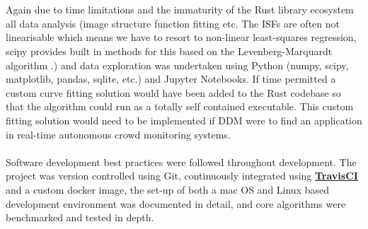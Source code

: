 \documentclass[11pt]{article}
\let\oldhref\href
\renewcommand{\href}[2]{\oldhref{#1}{\bfseries#2}}
\begin{document}
\\\\
Again due to time limitations and the immaturity of the Rust library ecosystem all data analysis (image structure function fitting etc. The ISFs are often not linearisable which means we have to resort to non-linear least-squares regression, scipy provides built in methods for this based on the Levenberg-Marquardt algorithm \cite{scipy_fit}.) and data exploration was undertaken using Python (numpy, scipy, matplotlib, pandas, sqlite, etc.) and Jupyter Notebooks. If time permitted a custom curve fitting solution would have been added to the Rust codebase so that the algorithm could run as a totally self contained executable. This custom fitting solution would need to be implemented if DDM were to find an application in real-time autonomous crowd monitoring systems.
\\\\
Software development best practices were followed throughout development. The project was version controlled using Git, continuously integrated using \href{https://travis-ci.com}{TravisCI} and a custom docker image, the set-up of both a mac OS and Linux based development environment was documented in detail, and core algorithms were benchmarked and tested in depth.
\\\\
\end{document}
